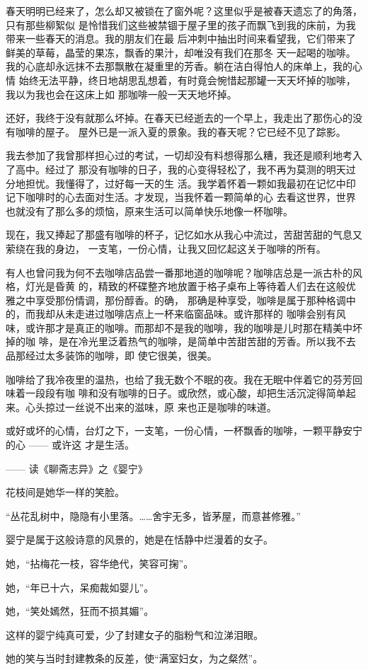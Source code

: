 		春天明明已经来了，怎么却又被锁在了窗外呢？这里似乎是被春天遗忘了的角落，只有那些柳絮似
	是怜惜我们这些被禁锢于屋子里的孩子而飘飞到我的床前，为我带来一些春天的消息。我的朋友们在最
	后冲刺中抽出时间来看望我，它们带来了鲜美的草莓，晶莹的果冻，飘香的果汁，却唯没有我们在那冬
	天一起喝的咖啡。我的心底却永远抹不去那飘散在凝重里的芳香。躺在洁白得怕人的床单上，我的心情
	始终无法平静，终日地胡思乱想着，有时竟会惋惜起那罐一天天坏掉的咖啡，我以为我也会在这床上如
	那咖啡一般一天天地坏掉。

		还好，我终于没有就那么坏掉。在春天已经逝去的一个早上，我走出了那伤心的没有咖啡的屋子。
	屋外已是一派入夏的景象。我的春天呢？它已经不见了踪影。

		我去参加了我曾那样担心过的考试，一切却没有料想得那么糟，我还是顺利地考入了高中。经过了
	那没有咖啡的日子，我的心变得轻松了，我不再为莫测的明天过分地担忧。我懂得了，过好每一天的生
	活。我学着怀着一颗如我最初在记忆中印记下咖啡时的心去面对生活。才发现，当我怀着一颗简单的心
	去看这世界，世界也就没有了那么多的烦恼，原来生活可以简单快乐地像一杯咖啡。

		现在，我又捧起了那盛有咖啡的杯子，记忆如水从我心中流过，苦甜苦甜的气息又萦绕在我的身边，
	一支笔，一份心情，让我又回忆起这关于咖啡的所有。

		有人也曾问我为何不去咖啡店品尝一番那地道的咖啡呢？咖啡店总是一派古朴的风格，灯光是昏黄
	的，精致的杯碟整齐地放置于格子桌布上等待着人们去在这般优雅之中享受那份情调，那份醇香。的确，
	那确是种享受，咖啡是属于那种格调中的，而我却从未走进过咖啡店点上一杯来临窗品味。或许那样的
	咖啡会别有风味，或许那才是真正的咖啡。而那却不是我的咖啡，我的咖啡是儿时那在精美中坏掉的咖
	啡，是在冷光里泛着热气的咖啡，是简单中苦甜苦甜的芳香。所以我不去品那经过太多装饰的咖啡，即
	使它很美，很美。

		咖啡给了我冷夜里的温热，也给了我无数个不眠的夜。我在无眠中伴着它的芬芳回味着一段段有咖
	啡和没有咖啡的日子。或欣然，或心酸，却把生活沉淀得简单起来。心头掠过一丝说不出来的滋味，原
	来也正是咖啡的味道。

		或好或坏的心情，台灯之下，一支笔，一份心情，一杯飘香的咖啡，一颗平静安宁的心 —— 或许这
	才是生活。

	\endwriting



		—— 读《聊斋志异》之《婴宁》

		花枝间是她华一样的笑脸。\par
		“丛花乱树中，隐隐有小里落。……舍宇无多，皆茅屋，而意甚修雅。”\par
		婴宁是属于这般诗意的风景的，她是在恬静中烂漫着的女子。\par
		她，“拈梅花一枝，容华绝代，笑容可掬”。\par
		她，“年已十六，呆痴裁如婴儿”。\par
		她，“笑处嫣然，狂而不损其媚”。\par
		这样的婴宁纯真可爱，少了封建女子的脂粉气和泣涕泪眼。\par
		她的笑与当时封建教条的反差，使“满室妇女，为之粲然”。

